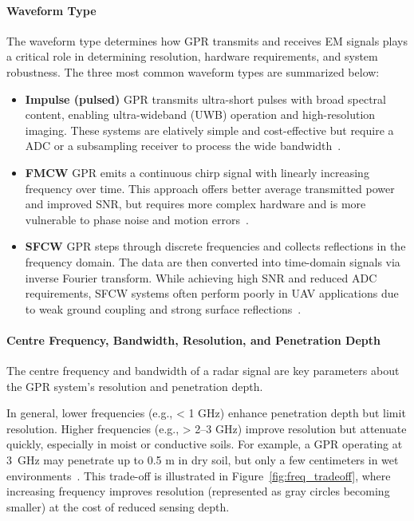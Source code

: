 \paragraph{Waveform Type}

The waveform type determines how \gls{GPR} transmits and receives \gls{EM} signals plays a critical role in determining resolution, hardware requirements, and system robustness. The three most common waveform types are summarized below:

\begin{itemize}
    \item \textbf{Impulse (pulsed)} \gls{GPR} transmits ultra-short pulses with broad spectral content, enabling ultra-wideband (UWB) operation and high-resolution imaging. These systems are elatively simple and cost-effective but require a \gls{ADC} or a subsampling receiver to process the wide bandwidth~\cite{chen2023ground,sipos2017drone}.

    \item \textbf{\gls{FMCW}} \gls{GPR} emits a continuous chirp signal with linearly increasing frequency over time. This approach offers better average transmitted power and improved \gls{SNR}, but requires more complex hardware and is more vulnerable to phase noise and motion errors~\cite{burr2018design}.
    
    \item \textbf{\gls{SFCW}} \gls{GPR} steps through discrete frequencies and collects reflections in the frequency domain. The data are then converted into time-domain signals via inverse Fourier transform. While achieving high \gls{SNR} and reduced \gls{ADC} requirements, \gls{SFCW} systems often perform poorly in \gls{UAV} applications due to weak ground coupling and strong surface reflections~\cite{tronca2018comparison}.
\end{itemize}


\paragraph{Centre Frequency, Bandwidth, Resolution, and Penetration Depth}

The centre frequency and bandwidth of a radar signal are key parameters about the \gls{GPR} system’s resolution and penetration depth. 

In general, lower frequencies (e.g., < 1 GHz) enhance penetration depth but limit resolution. Higher frequencies (e.g., > 2--3 GHz) improve resolution but attenuate quickly, especially in moist or conductive soils. For example, a \gls{GPR} operating at 3~GHz may penetrate up to 0.5 m in dry soil, but only a few centimeters in wet environments~\cite{9758040}. This trade-off is illustrated in Figure~\ref{fig:freq_tradeoff}, where increasing frequency improves resolution (represented as gray circles becoming smaller) at the cost of reduced sensing depth.

